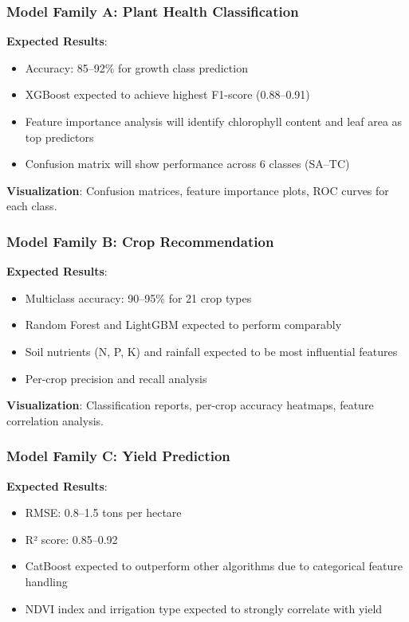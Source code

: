 \documentclass[conference]{IEEEtran}
\begin{document}
\subsubsection{Model Family A: Plant Health Classification}

\textbf{Expected Results}:
\begin{itemize}
\item Accuracy: 85--92\% for growth class prediction
\item XGBoost expected to achieve highest F1-score (0.88--0.91)
\item Feature importance analysis will identify chlorophyll content and leaf area as top predictors
\item Confusion matrix will show performance across 6 classes (SA--TC)
\end{itemize}

\textbf{Visualization}: Confusion matrices, feature importance plots, ROC curves for each class.

\subsubsection{Model Family B: Crop Recommendation}

\textbf{Expected Results}:
\begin{itemize}
\item Multiclass accuracy: 90--95\% for 21 crop types
\item Random Forest and LightGBM expected to perform comparably
\item Soil nutrients (N, P, K) and rainfall expected to be most influential features
\item Per-crop precision and recall analysis
\end{itemize}

\textbf{Visualization}: Classification reports, per-crop accuracy heatmaps, feature correlation analysis.

\subsubsection{Model Family C: Yield Prediction}

\textbf{Expected Results}:
\begin{itemize}
\item RMSE: 0.8--1.5 tons per hectare
\item R² score: 0.85--0.92
\item CatBoost expected to outperform other algorithms due to categorical feature handling
\item NDVI index and irrigation type expected to strongly correlate with yield
\end{itemize}
\end{document}
